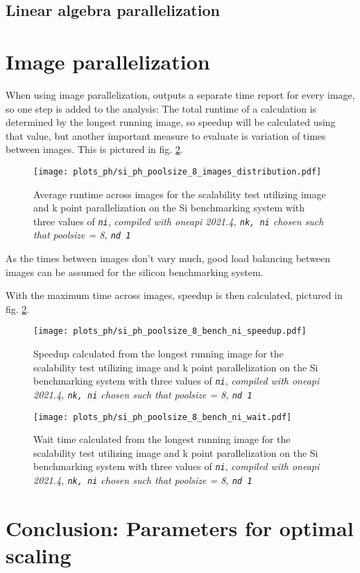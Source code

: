 \documentclass[main.tex]{subfiles}
\begin{document}
\subsection{Linear algebra parallelization}

\section{Image parallelization}\label{sec:scaling_ph_images}

When using image parallelization, \QE outputs a separate time report for every image, so one step is added to the analysis:
The total runtime of a calculation is determined by the longest running image, so speedup will be calculated using that value, but another important measure to evaluate is variation of times between images.
This is pictured in fig. \ref{fig:scaling_ph_ni_poolsize_8_si}.

\begin{figure}[ht!]
    \centering
    \texttt{[image: plots\_ph/si\_ph\_poolsize\_8\_images\_distribution.pdf]}
    \caption{Average runtime across images for the scalability test utilizing image and k point parallelization on the Si benchmarking system with three values of \emph{\texttt{ni}}, \emph{\QE compiled with \gls{oneapi} 2021.4, \texttt{nk, ni} chosen such that poolsize = 8, \texttt{nd 1}}}
    \label{fig:scaling_ph_ni_poolsize_8_si_distribution}
\end{figure}
As the times between images don't vary much, good load balancing between images can be assumed for the silicon benchmarking system.

With the maximum time across images, speedup is then calculated, pictured in fig. \ref{fig:scaling_ph_ni_poolsize_8_si}.

\begin{figure}[ht!]
    \centering
    \texttt{[image: plots\_ph/si\_ph\_poolsize\_8\_bench\_ni\_speedup.pdf]}
    \caption{Speedup calculated from the longest running image for the scalability test utilizing image and k point parallelization on the Si benchmarking system with three values of \emph{\texttt{ni}}, \emph{\QE compiled with \gls{oneapi} 2021.4, \texttt{nk, ni} chosen such that poolsize = 8, \texttt{nd 1}}}
    \label{fig:scaling_ph_ni_poolsize_8_si}
\end{figure}


\begin{figure}[ht!]
    \centering
    \texttt{[image: plots\_ph/si\_ph\_poolsize\_8\_bench\_ni\_wait.pdf]}
    \caption{Wait time calculated from the longest running image for the scalability test utilizing image and k point parallelization on the Si benchmarking system with three values of \emph{\texttt{ni}}, \emph{\QE compiled with \gls{oneapi} 2021.4, \texttt{nk, ni} chosen such that poolsize = 8, \texttt{nd 1}}}
    \label{fig:scaling_ph_ni_poolsize_8_si_wait}
\end{figure}

\section{Conclusion: Parameters for optimal scaling}
\end{document}
